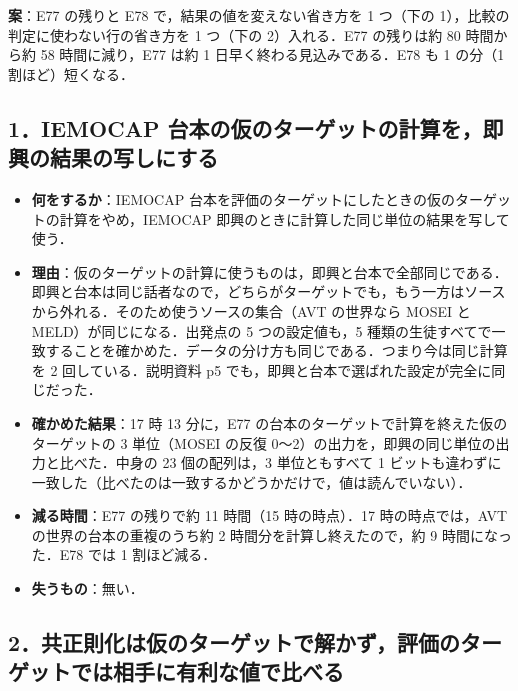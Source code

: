 \begin{tcolorbox}
\textbf{案}：E77 の残りと E78 で，結果の値を変えない省き方を 1 つ（下の 1），比較の判定に使わない行の省き方を 1 つ（下の 2）入れる．E77 の残りは約 80 時間から約 58 時間に減り，E77 は約 1 日早く終わる見込みである．E78 も 1 の分（1 割ほど）短くなる．
\end{tcolorbox}

\subsection{1．IEMOCAP 台本の仮のターゲットの計算を，即興の結果の写しにする}

\begin{itemize}
\item \textbf{何をするか}：IEMOCAP 台本を評価のターゲットにしたときの仮のターゲットの計算をやめ，IEMOCAP 即興のときに計算した同じ単位の結果を写して使う．
\item \textbf{理由}：仮のターゲットの計算に使うものは，即興と台本で全部同じである．即興と台本は同じ話者なので，どちらがターゲットでも，もう一方はソースから外れる．そのため使うソースの集合（AVT の世界なら MOSEI と MELD）が同じになる．出発点の 5 つの設定値も，5 種類の生徒すべてで一致することを確かめた．データの分け方も同じである．つまり今は同じ計算を 2 回している．説明資料 p5 でも，即興と台本で選ばれた設定が完全に同じだった．
\item \textbf{確かめた結果}：17 時 13 分に，E77 の台本のターゲットで計算を終えた仮のターゲットの 3 単位（MOSEI の反復 0〜2）の出力を，即興の同じ単位の出力と比べた．中身の 23 個の配列は，3 単位ともすべて 1 ビットも違わずに一致した（比べたのは一致するかどうかだけで，値は読んでいない）．
\item \textbf{減る時間}：E77 の残りで約 11 時間（15 時の時点）．17 時の時点では，AVT の世界の台本の重複のうち約 2 時間分を計算し終えたので，約 9 時間になった．E78 では 1 割ほど減る．
\item \textbf{失うもの}：無い．
\end{itemize}

\subsection{2．共正則化は仮のターゲットで解かず，評価のターゲットでは相手に有利な値で比べる}

